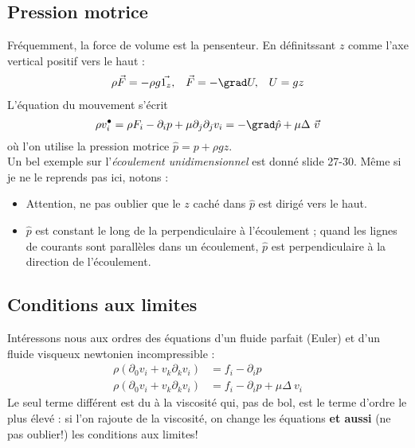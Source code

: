 		
	\subsection{Pression motrice}
	Fréquemment, la force de volume est la pensenteur. En définitssant $z$ comme l'axe
	vertical positif vers le haut :
	\begin{equation}
	\begin{array}{ccc}
	\rho\vec{F}=-\rho g\vec{1_z}, & \vec{F}=-\grad U, & U=gz
	\end{array}
	\end{equation}
	L'équation du mouvement s'écrit 
	\begin{equation}
	\rho v_i^\bullet = \rho F_i - \partial_i p +\mu\partial_j\partial_jv_i = -\grad\hat{p}
	+\mu\Delta\ \vec v
	\end{equation}
	où l'on utilise la pression motrice $\hat{p}=p+\rho gz$.\\
	Un bel exemple sur l'\textit{écoulement unidimensionnel} est donné slide 27-30. Même 
	si je ne le reprends pas ici, notons :
	\begin{itemize}
	\item Attention, ne pas oublier que le $z$ caché dans $\hat{p}$ est dirigé vers le 
	haut.
	\item $\hat{p}$ est constant le long de la perpendiculaire à l'écoulement ; quand les 
	lignes de courants sont parallèles dans un écoulement, $\hat{p}$ est perpendiculaire 
	à la direction de l'écoulement.
	\end{itemize}
	
	
	\subsection{Conditions aux limites}
	Intéressons nous aux ordres des équations d'un fluide parfait (Euler) et d'un fluide 
	visqueux newtonien incompressible :
	\begin{equation}
	\begin{array}{ll}
	\rho(\partial_0v_i + v_k\partial_kv_i) &= f_i-\partial_i p\\
	\rho(\partial_0v_i + v_k\partial_kv_i) &= f_i-\partial_i p + \mu\Delta\ v_i
	\end{array}
	\end{equation}
	Le seul terme différent est du à la viscosité qui, pas de bol, est le terme d'ordre 
	le plus élevé : si l'on rajoute de la viscosité, on change les équations \textbf{et 
	aussi} (ne pas oublier!) les conditions aux limites!
	
